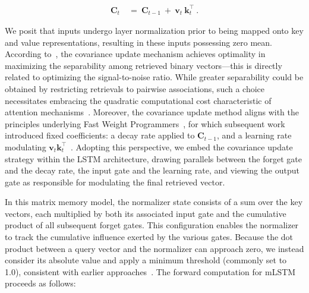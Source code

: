 \begin{align}
\mathbf{C}_t \ &= \ \mathbf{C}_{t-1} \ + \ \mathbf{v}_{t} \ \mathbf{k}_t^\top \ .
\end{align}

We posit that inputs undergo layer normalization prior to being mapped onto key and value representations, resulting in these inputs possessing zero mean. According to~\citep{Dayan:91}, the covariance update mechanism achieves optimality in maximizing the separability among retrieved binary vectors—this is directly related to optimizing the signal-to-noise ratio. While greater separability could be obtained by restricting retrievals to pairwise associations, such a choice necessitates embracing the quadratic computational cost characteristic of attention mechanisms~\citep{Krotov:16,Krotov:17,Ramsauer:21}. Moreover, the covariance update method aligns with the principles underlying Fast Weight Programmers~\citep{Schmidhuber:92ncfastweights,Schlag:21}, for which subsequent work introduced fixed coefficients: a decay rate applied to $\mathbf{C}_{t-1}$, and a learning rate modulating 
$\mathbf{v}_{t} \mathbf{k}_t ^\top$~\citep{Ba:16}. Adopting this perspective, we embed the covariance update strategy within the LSTM architecture, drawing parallels between the forget gate and the decay rate, the input gate and the learning rate, and viewing the output gate as responsible for modulating the final retrieved vector.

In this matrix memory model, the normalizer state consists of a sum over the key vectors, each multiplied by both its associated input gate and the cumulative product of all subsequent forget gates. This configuration enables the normalizer to track the cumulative influence exerted by the various gates. Because the dot product between a query vector and the normalizer can approach zero, we instead consider its absolute value and apply a minimum threshold (commonly set to 1.0), consistent with earlier approaches~\citep{Sun:23arxiv}. The forward computation for mLSTM proceeds as follows:

